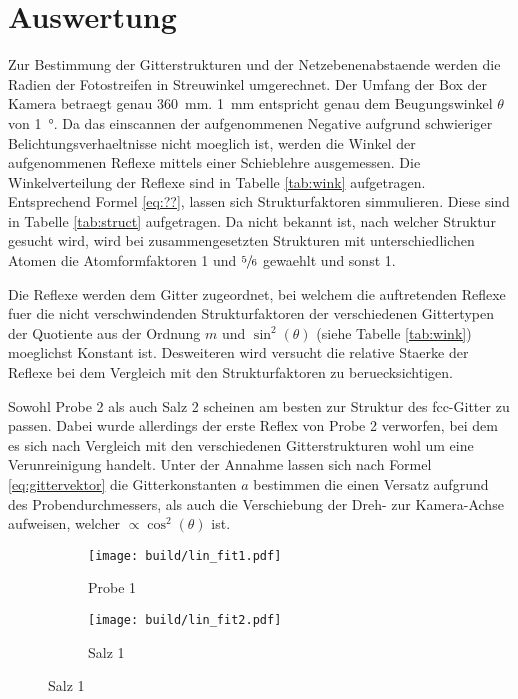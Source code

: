 \section{Auswertung}\label{sec:Auswertung}

Zur Bestimmung der Gitterstrukturen und der Netzebenenabstaende werden die
Radien der Fotostreifen in Streuwinkel umgerechnet. 
Der Umfang der Box der Kamera betraegt genau \SI{360}{\milli\meter}.
\SI{1}{\milli\meter} entspricht genau dem Beugungswinkel $\theta$ von 
\SI{1}{\degree}. 
Da das einscannen der aufgenommenen Negative aufgrund schwieriger
Belichtungsverhaeltnisse nicht moeglich ist, werden die Winkel der aufgenommenen
Reflexe mittels einer Schieblehre ausgemessen. 
Die Winkelverteilung der Reflexe sind in Tabelle \ref{tab:wink} aufgetragen. 
Entsprechend Formel \ref{eq:??}, lassen sich Strukturfaktoren simmulieren. 
Diese sind in Tabelle \ref{tab:struct} aufgetragen. 
Da nicht bekannt ist, nach welcher Struktur gesucht wird, wird bei 
zusammengesetzten Strukturen mit unterschiedlichen Atomen die Atomformfaktoren 
1 und $\sfrac{5}{6}$ gewaehlt und sonst 1. 

Die Reflexe werden dem Gitter zugeordnet, bei welchem die auftretenden Reflexe fuer
die nicht verschwindenden Strukturfaktoren der verschiedenen Gittertypen der 
Quotiente aus der Ordnung $m$ und $\sin^2(\theta)$ (siehe Tabelle \ref{tab:wink})
moeglichst Konstant ist.
Desweiteren wird versucht die relative Staerke der Reflexe bei dem Vergleich mit den
Strukturfaktoren zu beruecksichtigen. 

Sowohl Probe 2 als auch Salz 2 scheinen am besten zur Struktur des fcc-Gitter zu
passen. 
Dabei wurde allerdings der erste Reflex von Probe 2 verworfen, bei dem es sich 
nach Vergleich mit den verschiedenen Gitterstrukturen wohl um eine Verunreinigung
handelt. 
Unter der Annahme lassen sich nach Formel \ref{eq:gittervektor} die 
Gitterkonstanten $a$ bestimmen die einen Versatz aufgrund des 
Probendurchmessers, als auch die Verschiebung der Dreh- zur Kamera-Achse 
aufweisen, welcher $\propto \cos^2(\theta)$ ist.
\begin{figure}[ht]
		\centering
		\caption{Bestimmung der exakten Gitterkonstanten aus der Abhaengigkeit 
		des	Messfehlers und den naiven Gittervektoren.}
		\begin{subfigure}{0.49\textwidth}
				\centering
				\texttt{[image: build/lin\_fit1.pdf]}
				\caption{Probe 1}
				\label{fig:prb1}
		\end{subfigure}
		\begin{subfigure}{0.49\textwidth}
				\centering
				\texttt{[image: build/lin\_fit2.pdf]}
				\caption{Salz 1}
				\label{fig:prb1}
		\end{subfigure}
\end{figure}


